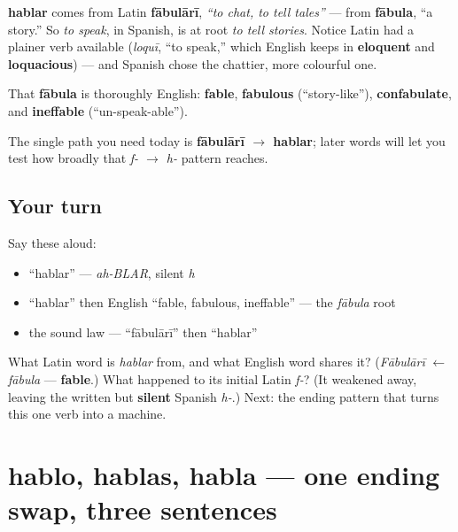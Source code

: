 \begin{cousinweb}
\textbf{hablar} comes from Latin \textbf{fābulārī}, \emph{\textquotedblleft{}to chat, to tell tales\textquotedblright{}} — from \textbf{fābula}, \textquotedblleft{}a story.\textquotedblright{} So \emph{to speak}, in Spanish, is at root \emph{to tell stories}. Notice Latin had a plainer verb available (\emph{loquī}, \textquotedblleft{}to speak,\textquotedblright{} which English keeps in \textbf{eloquent} and \textbf{loquacious}) — and Spanish chose the chattier, more colourful one.

That \textbf{fābula} is thoroughly English: \textbf{fable}, \textbf{fabulous} (\textquotedblleft{}story-like\textquotedblright{}), \textbf{confabulate}, and \textbf{ineffable} (\textquotedblleft{}un-speak-able\textquotedblright{}).

The single path you need today is \textbf{fābulārī $\to$ hablar}; later words will let you test how broadly that \emph{f- $\to$ h-} pattern reaches.
\end{cousinweb}

\subsection*{Your turn}
Say these aloud:

\begin{itemize}
\raggedright
  \item \textquotedblleft{}hablar\textquotedblright{} — \emph{ah-BLAR}, silent \emph{h}
  \item \textquotedblleft{}hablar\textquotedblright{} then English \textquotedblleft{}fable, fabulous, ineffable\textquotedblright{} — the \emph{fābula} root
  \item the sound law — \textquotedblleft{}fābulārī\textquotedblright{} then \textquotedblleft{}hablar\textquotedblright{}
\end{itemize}

\begin{tcolorbox}[breakable,colback=teal!4,colframe=teal!35!black,title={Before you move on}]
What Latin word is \emph{hablar} from, and what English word shares it? (\emph{Fābulārī} $\leftarrow$ \emph{fābula} — \textbf{fable}.) What happened to its initial Latin \emph{f-}? (It weakened away, leaving the written but \textbf{silent} Spanish \emph{h-}.) Next: the ending pattern that turns this one verb into a machine.
\end{tcolorbox}
\section[hablo, hablas, habla]{hablo, hablas, habla — one ending swap, three sentences}

